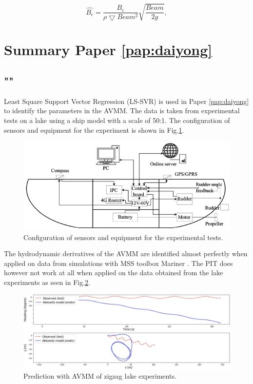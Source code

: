 

\begin{equation} \label{eq:be_eqvalent}
    \hat{B_e} = \frac{B_e}{\rho \bigtriangledown Beam^2} \sqrt{\frac{Beam}{2g}},
\end{equation}



\section{Summary Paper \ref{pap:daiyong}}
\subsection*{""}
Least Square Support Vector Regression (LS-SVR) \cite{brereton_support_2010} is used in Paper \ref{pap:daiyong} to identify the parameters in the AVMM.  
The data is taken from experimental tests on a lake using a ship model with a scale of 50:1. The configuration of sensors and equipment for the experiment is shown in Fig.\ref{fig:cthmodel}.  
\begin{figure}[H]
    \centering
    \includegraphics[width=\textwidth]{kappa/images/cth_model.png}
    \caption{Configuration of sensors and equipment for the experimental tests.}
    \label{fig:cthmodel}
\end{figure}
\noindent The hydrodynamic derivatives of the AVMM are identified almost perfectly when applied on data from simulations with MSS toolbox Mariner \cite{tristan_matlab_2009}. The PIT does however not work at all when applied on the data obtained from the lake experiments as seen in Fig.\ref{fig:daiyong_extrapolation}. 

\begin{figure}[H]
    \centering
    \includegraphics[width=\linewidth]{kappa/images/daiyong_extrapolation.jpeg}
    \caption{Prediction with AVMM of zigzag lake experiments.}
    \label{fig:daiyong_extrapolation}
\end{figure}


